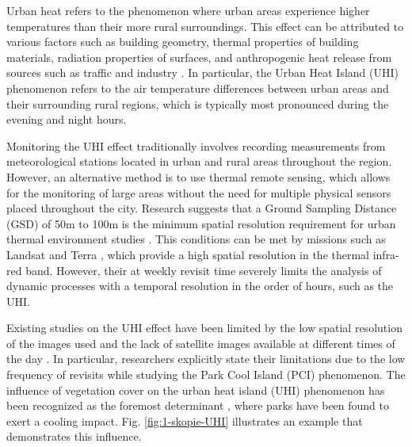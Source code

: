     Urban heat refers to the phenomenon where urban areas experience higher temperatures than their more rural surroundings.
    This effect can be attributed to various factors such as building geometry, thermal properties of building materials, radiation properties of surfaces, and anthropogenic heat release from sources such as traffic and industry \cite{deilami2018urban}. 
    In particular,  the Urban Heat Island (UHI) phenomenon refers to the air temperature differences between urban areas and their surrounding rural regions, which is typically most pronounced during the evening and night hours. 

    Monitoring the UHI effect traditionally involves recording measurements from meteorological stations located in urban and rural areas throughout the region.
    However, an alternative method is to use thermal remote sensing, which allows for the monitoring of large areas without the need for multiple physical sensors placed throughout the city.
    Research suggests that a Ground Sampling Distance (GSD) of 50m to 100m is the minimum spatial resolution requirement for urban thermal environment studies \cite{mohamed2017land, sobrino2012impact, huang2013generating}. 
    This conditions can be met by missions such as Landsat \cite{USGS2023Landsat} and Terra \cite{terra_nasa}, which provide a high spatial resolution in the thermal infra-red band.
    However, their at weekly revisit time severely limits the analysis of dynamic processes with a temporal resolution in the order of hours, such as the UHI. 

    Existing studies on the UHI effect have been limited by the low spatial resolution of the images used and the lack of satellite images available at different times of the day \cite{Zhu2021, Shi2019}. 
    In particular, researchers explicitly state their limitations \cite{Shi2019} due to the low frequency of revisits while studying the Park Cool Island (PCI) \cite{Yang2017} phenomenon. 
    The influence of vegetation cover on the urban heat island (UHI) phenomenon has been recognized as the foremost determinant \cite{deilami2018urban}, where parks have been found to exert a cooling impact.
    Fig. \ref{fig:1-skopie-UHI} illustrates an example that demonstrates this influence. 
    

